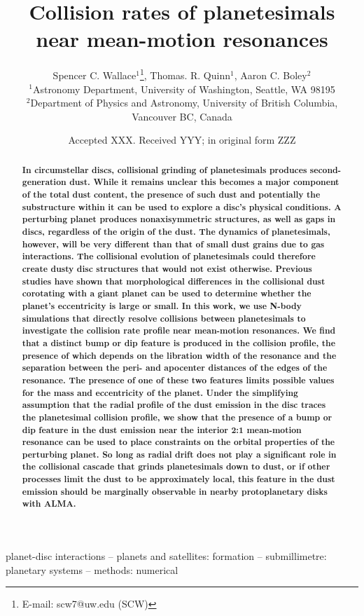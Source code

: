 \documentclass[fleqn,usenatbib]{mnras}
\title[Collision rates of planetesimals]{Collision rates of planetesimals near mean-motion resonances}
\author[S. C. Wallace et al.]{
Spencer C. Wallace$^{1}$\thanks{E-mail: scw7@uw.edu (SCW)},
Thomas. R. Quinn$^{1}$,
Aaron C. Boley$^{2}$
\\
$^{1}$Astronomy Department, University of Washington, Seattle, WA 98195\\
$^{2}$Department of Physics and Astronomy, University of British Columbia, Vancouver BC, Canada
}
\date{Accepted XXX. Received YYY; in original form ZZZ}
\begin{document}
\label{firstpage}
\pagerange{\pageref{firstpage}--\pageref{lastpage}}
\maketitle

\begin{abstract}
\textbf{In circumstellar discs, collisional grinding of planetesimals produces second-generation dust. While it remains unclear this becomes a major component of the total dust content, 
the presence of such dust and potentially the substructure within it can be used to explore a disc's physical conditions. A perturbing planet produces nonaxisymmetric structures, as
well as gaps in discs, regardless of the origin of the dust. The dynamics of planetesimals, however, will be very different than that of small dust grains due to gas interactions. The
collisional evolution of planetesimals could therefore create dusty disc structures that would not exist otherwise. Previous studies have shown that morphological differences in the
collisional dust corotating with a giant planet can be used to determine whether the planet's eccentricity is large or small. In this work, we use N-body simulations that directly resolve
collisions between planetesimals to investigate the collision rate profile near mean-motion resonances. We  find that a distinct bump or dip feature is produced in the collision profile,
the presence of which depends on the libration width of the resonance and the separation between the peri- and apocenter distances of the edges of the resonance. The presence of
one of these two features limits possible values for the mass and eccentricity of the planet. Under the simplifying assumption that the radial profile of the dust emission in the disc
traces the planetesimal collision profile, we show that the presence of a bump or dip feature in the dust emission near the interior 2:1 mean-motion resonance can be used to place 
constraints on the orbital properties of the perturbing planet. So long as radial drift does not play a significant role in the collisional cascade that grinds planetesimals down to dust, or if 
other processes limit the dust to be approximately local, this feature in the dust emission should be marginally observable in nearby protoplanetary disks with ALMA.}
\end{abstract}

\begin{keywords}
planet-disc interactions -- planets and satellites: formation -- submillimetre: planetary systems -- methods: numerical
\end{keywords}
\end{document}
